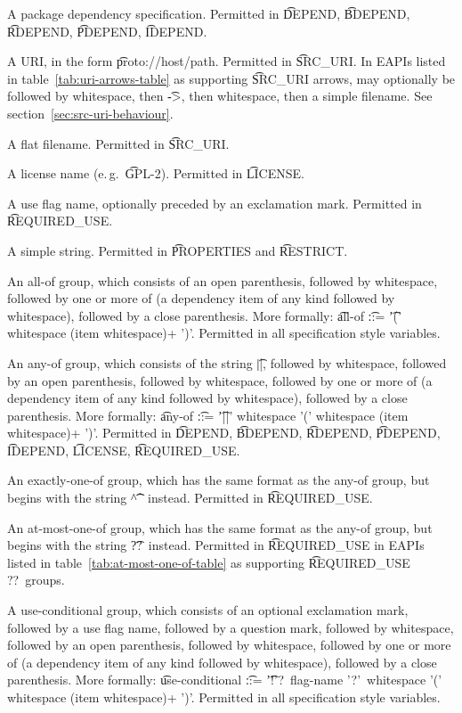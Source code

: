 \begin{compactitem}
\item A package dependency specification. Permitted in \t{DEPEND}, \t{BDEPEND}, \t{RDEPEND},
    \t{PDEPEND}, \t{IDEPEND}.
\item A URI, in the form \t{proto://host/path}. Permitted in \t{SRC_URI}\@.
    In EAPIs listed in table~\ref{tab:uri-arrows-table} as supporting \t{SRC_URI} arrows, may
    optionally be followed by whitespace, then \t{->}, then whitespace, then a simple filename.
    See section~\ref{sec:src-uri-behaviour}.
\item A flat filename. Permitted in \t{SRC_URI}.
\item A license name (e.\,g.\ \t{GPL-2}). Permitted in \t{LICENSE}.
\item A use flag name, optionally preceded by an exclamation mark. Permitted in \t{REQUIRED_USE}.
\item A simple string. Permitted in \t{PROPERTIES} and \t{RESTRICT}.
\item An all-of group, which consists of an open parenthesis, followed by whitespace,
    followed by one or more of (a dependency item of any kind followed by whitespace), followed
    by a close parenthesis. More formally:
    \t{all-of} \t{::=} \t{'(' whitespace (item whitespace)+ ')'}. Permitted in all specification
    style variables.
\item An any-of group, which consists of the string \t{||}, followed by whitespace,
    followed by an open parenthesis, followed by whitespace, followed by one or more
    of (a dependency item of any kind followed by whitespace), followed by a close parenthesis.
    More formally: \t{any-of} \t{::=} \t{'||' whitespace '(' whitespace (item whitespace)+ ')'}.
    Permitted in \t{DEPEND}, \t{BDEPEND}, \t{RDEPEND}, \t{PDEPEND}, \t{IDEPEND}, \t{LICENSE},
    \t{REQUIRED_USE}.
\item An exactly-one-of group, which has the same format as the any-of group, but begins with the
    string \t{\textasciicircum\textasciicircum} instead. Permitted in \t{REQUIRED_USE}.
\item {} An at-most-one-of group, which has the same format as the
    any-of group, but begins with the string \t{??}\ instead. Permitted in \t{REQUIRED_USE} in
    EAPIs listed in table~\ref{tab:at-most-one-of-table} as supporting \t{REQUIRED_USE ??}\ groups.
\item A use-conditional group, which consists of an optional exclamation mark, followed by
    a use flag name, followed by a question mark, followed by whitespace, followed by
    an open parenthesis, followed by whitespace, followed by one or more of (a dependency item
    of any kind followed by whitespace), followed by a close parenthesis. More formally:
    \t{use-conditional} \t{::=} \t{'!'?\ flag-name '?'\ whitespace '(' whitespace (item
    whitespace)+ ')'}.
    Permitted in all specification style variables.
\end{compactitem}

